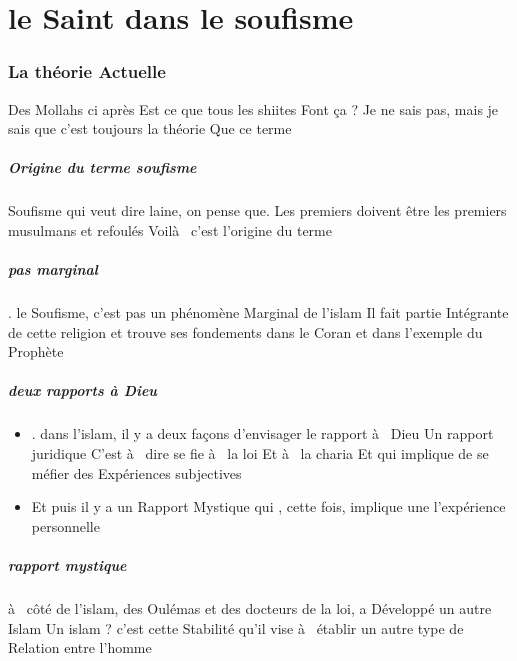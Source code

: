\chapter{le Saint dans le soufisme}


\subsection{
La théorie 
Actuelle }

Des 
Mollahs 
 ci après 
Est ce que tous les shiites 
Font ça ? Je ne sais pas, mais je sais que c'est toujours la théorie 
Que ce terme 

\paragraph{Origine du terme soufisme}
Soufisme qui  veut dire laine, on pense que.
Les premiers doivent 
être les premiers musulmans et refoulés 
Voilà   c'est l'origine du terme 

\paragraph{pas marginal} . le 
Soufisme, c'est pas un phénomène 
Marginal de l'islam 
Il fait partie 
Intégrante de cette religion et trouve ses fondements dans le Coran et dans l'exemple du Prophète 

\paragraph{deux rapports à Dieu}
\begin{itemize}
    \item  . dans l'islam, il y a deux façons d'envisager le rapport à  Dieu 
Un rapport juridique  C'est à  dire se fie à  la loi 
Et à  la charia 
Et qui  implique de se méfier des 
Expériences subjectives 
\item 
Et puis il y a un 
Rapport 
Mystique qui , cette fois, implique une l'expérience personnelle 
\end{itemize}


\paragraph{rapport mystique}
 à  côté de l'islam, des 
Oulémas et des docteurs de la loi, a 
Développé un autre 
Islam 
Un islam ?   c'est cette 
Stabilité qu'il vise à  établir un autre type de 
Relation entre l'homme  

